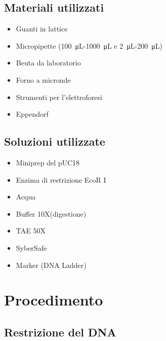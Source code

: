 \subsection{Materiali utilizzati}

\begin{itemize}
	\item Guanti in lattice
	\item Micropipette (\SI{100}{\micro\liter}-\SI{1000}{\micro\liter} e \SI{2}{\micro\liter}-\SI{200}{\micro\liter})
	\item Beuta da laboratorio
	\item Forno a micronde
	\item Strumenti per l'elettroforesi
	\item Eppendorf
\end{itemize}

\subsection{Soluzioni utilizzate}

\begin{itemize}

	\item Miniprep del pUC18
	\item Enzima di restrizione EcoR I
	\item Acqua
	\item Buffer 10X(digestione)
	\item TAE 50X
	\item SyberSafe
	\item Marker (DNA Ladder)

\end{itemize}

\section{Procedimento}

\subsection{Restrizione del DNA}

